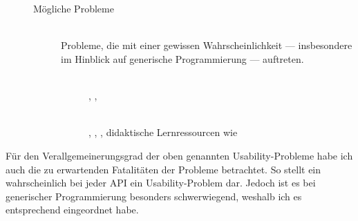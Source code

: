 \begin{description}
\begin{description}
\begin{description}
      \item[]  \\
  
      \item[]  \\
    \end{description}
  
    \item[Mögliche Probleme] \hfill \\ Probleme, die mit einer gewissen Wahrscheinlichkeit --- insbesondere im Hinblick auf generische Programmierung --- auftreten.
    \begin{description}
      \item[]  \\
      , , 
    
      \item[]  \\
      , , , didaktische Lernressourcen wie 
    \end{description}
  \end{description}
\end{description}

\bigskip

Für den Verallgemeinerungsgrad der oben genannten Usability-Probleme habe ich auch die zu erwartenden Fatalitäten der Probleme betrachtet. So stellt ein  wahrscheinlich bei jeder API ein Usability-Problem dar. Jedoch ist es bei generischer Programmierung besonders schwerwiegend, weshalb ich es entsprechend eingeordnet habe.


